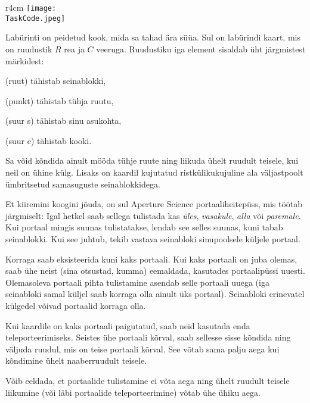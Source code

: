 ﻿\documentclass{boi2014-et}
\renewcommand{\TaskCode}{portals}
\newcommand{\constant}[1]{{\tt #1}}
\begin{document}
    \begin{wrapfigure}[4]{r}{4cm}
        \vspace{-24pt}
        \texttt{[image: \\TaskCode.jpeg]}
    \end{wrapfigure}

    Labürinti on peidetud kook, mida sa tahad ära süüa.
    Sul on labürindi kaart, mis on ruudustik $R$ rea ja $C$ veeruga.
    Ruudustiku iga element sisaldab üht järgmistest märkidest:
    \begin{description}[itemindent=1pt]
        \item[\constant{\#}] (ruut) tähistab seinablokki,
        \item[\constant{.}] (punkt) tähistab tühja ruutu,
        \item[\constant{S}] (suur s) tähistab sinu asukohta,
        \item[\constant{C}] (suur c) tähistab kooki.
    \end{description}

    Sa võid kõndida ainult mööda tühje ruute ning liikuda ühelt ruudult teisele,
    kui neil on ühine külg. Lisaks on kaardil kujutatud ristkülikukujuline ala
    väljastpoolt ümbritsetud samasuguste seinablokkidega.

    Et kiiremini koogini jõuda, on sul Aperture Science\texttrademark{}
    portaaliheitepüss, mis töötab järgmiselt:
    Igal hetkel saab sellega tulistada kas
    \emph{üles}, \emph{vasakule}, \emph{alla} või \emph{paremale}.
    Kui portaal mingis suunas tulistatakse, lendab see selles suunas, kuni tabab seinablokki.
    Kui see juhtub, tekib vastava seinabloki sinupoolsele küljele portaal.

    Korraga saab eksisteerida kuni kaks portaali. Kui kaks portaali on juba olemas,
    saab ühe neist (sina otsustad, kumma) eemaldada, kasutades portaalipüssi uuesti.
    Olemasoleva portaali pihta tulistamine asendab selle portaali uuega
    (iga seinabloki samal küljel saab korraga olla ainult üks portaal).
    Seinabloki erinevatel külgedel võivad portaalid korraga olla.

    Kui kaardile on kaks portaali paigutatud, saab neid kasutada enda teleporteerimiseks.
    Seistes ühe portaali kõrval, saab sellesse sisse kõndida ning väljuda ruudul,
    mis on teise portaali kõrval. See võtab sama palju aega kui kõndimine ühelt naaberruudult teisele.

    Võib eeldada, et portaalide tulistamine ei võta aega ning ühelt ruudult teisele liikumine
    (või läbi portaalide teleporteerimine) võtab ühe ühiku aega.
\end{document}
